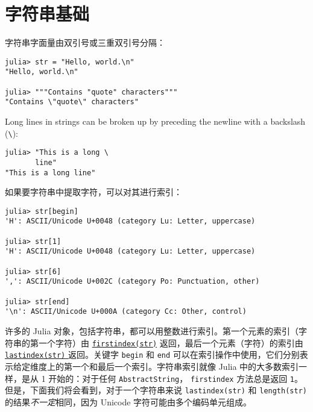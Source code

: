 \hypertarget{6723865345393966445}{}


\section{字符串基础}



字符串字面量由双引号或三重双引号分隔：




\begin{verbatim}
julia> str = "Hello, world.\n"
"Hello, world.\n"

julia> """Contains "quote" characters"""
"Contains \"quote\" characters"
\end{verbatim}



Long lines in strings can be broken up by preceding the newline with a backslash (\texttt{{\textbackslash}}):




\begin{verbatim}
julia> "This is a long \
       line"
"This is a long line"
\end{verbatim}



如果要字符串中提取字符，可以对其进行索引：




\begin{verbatim}
julia> str[begin]
'H': ASCII/Unicode U+0048 (category Lu: Letter, uppercase)

julia> str[1]
'H': ASCII/Unicode U+0048 (category Lu: Letter, uppercase)

julia> str[6]
',': ASCII/Unicode U+002C (category Po: Punctuation, other)

julia> str[end]
'\n': ASCII/Unicode U+000A (category Cc: Other, control)
\end{verbatim}



许多的 Julia 对象，包括字符串，都可以用整数进行索引。第一个元素的索引（字符串的第一个字符）由 \hyperlink{16943669671291374223}{\texttt{firstindex(str)}} 返回，最后一个元素（字符）的索引由 \href{@ref}{\texttt{lastindex(str)} } 返回。关键字 \texttt{begin} 和 \texttt{end} 可以在索引操作中使用，它们分别表示给定维度上的第一个和最后一个索引。字符串索引就像 Julia 中的大多数索引一样，是从 1 开始的：对于任何 \texttt{AbstractString}， \texttt{firstindex} 方法总是返回 \texttt{1}。但是，下面我们将会看到，对于一个字符串来说 \texttt{lastindex(str)} 和 \texttt{length(str)} 的结果\emph{不一定}相同，因为 Unicode 字符可能由多个编码单元组成。



